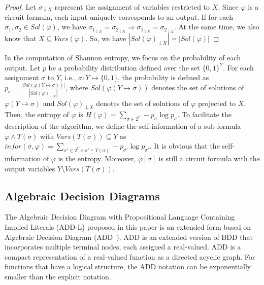 \begin{proof}
		Let $\sigma_{\downarrow X}$ represent the assignment of variables restricted to $X$.
		Since $\varphi$ is a circuit formula, each input uniquely corresponds to an output.
		If for each $\sigma_1, \sigma_2 \in \mathit{Sol}(\varphi)$, we have $\sigma_{1_{\downarrow X}} = \sigma_{2_{\downarrow X}} \Longrightarrow \sigma_{1_{\downarrow X}} = \sigma_{2_{\downarrow X}}$. 
		At the same time, we also know that $X \subseteq Vars(\varphi)$.
		So, we have $ \left| \mathit{Sol}(\varphi)_{\downarrow X} \right| = \left| \mathit{Sol}(\varphi)  \right|$
\end{proof}


    In the computation of Shannon entropy, we focus on the probability of each output.
	Let $p$ be a probability distribution defined over the set $\{0,1\}^Y$.
	For each assignment $\sigma$ to $Y$, i.e., $\sigma:Y \mapsto \{0,1\}$, the probability is defined as $p_{\sigma} = \frac{\left| \mathit{Sol}(\varphi(Y \mapsto \sigma)) \right|}{ \left| \mathit{Sol}(\varphi)_{\downarrow X} \right| }$, where $\mathit{Sol}(\varphi(Y \mapsto \sigma))$ denotes the set of solutions of $\varphi(Y \mapsto \sigma)$ and $\mathit{Sol}(\varphi)_{\downarrow X}$ denotes the set of solutions of $\varphi$ projected to $X$.
	Then, the entropy of $\varphi$ is $H(\varphi) = \sum_{\sigma \in 2^Y} -p_{\sigma} \log {p_{\sigma}}$.
To facilitate the description of the algorithm, we define the self-information of a sub-formula $\varphi \land T(\sigma)$ with $\mathit{Vars}(T(\sigma)) \subseteq Y$ as
$\mathit{infor}(\sigma, \varphi) = \sum_{\sigma' \in 2^Y \land \sigma' \models T(\sigma)} -p_{\sigma'} \log {p_{\sigma'}}$.
It is obvious that the self-information of $\varphi$ is the entropy.
Moreover, $\varphi[\sigma]$ is still a circuit formula with the output variables $Y \setminus \mathit{Vars}(T(\sigma))$.



\subsection{Algebraic Decision Diagrams}
The Algebraic Decision Diagram with Propositional Language Containing Implied Literals (ADD-L) proposed in this paper is an extended form based on Algebraic Decision Diagram (ADD~\cite{bahar1997algebric}).
ADD is an extended version of BDD that incorporates multiple terminal nodes, each assigned a real-valued. 
ADD is a compact representation of a real-valued function as a directed acyclic graph. 
For functions that have a logical structure, the ADD notation can be exponentially smaller than the explicit notation. 

